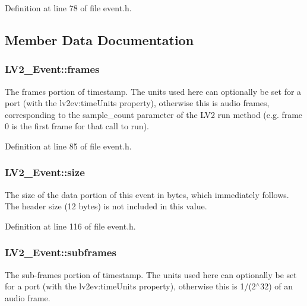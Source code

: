 Definition at line 78 of file event.\+h.



\subsection{Member Data Documentation}
\subsubsection[{\texorpdfstring{frames}{frames}}]{ L\+V2\+\_\+\+Event\+::frames}\hypertarget{struct_l_v2___event_ab7de52fc53223b6fe231f4bde89c563d}{}\label{struct_l_v2___event_ab7de52fc53223b6fe231f4bde89c563d}
The frames portion of timestamp. The units used here can optionally be set for a port (with the lv2ev\+:time\+Units property), otherwise this is audio frames, corresponding to the sample\+\_\+count parameter of the L\+V2 run method (e.\+g. frame 0 is the first frame for that call to run). 

Definition at line 85 of file event.\+h.

\subsubsection[{\texorpdfstring{size}{size}}]{ L\+V2\+\_\+\+Event\+::size}\hypertarget{struct_l_v2___event_a2036cca2f4ebb4f4010f187a78af3f57}{}\label{struct_l_v2___event_a2036cca2f4ebb4f4010f187a78af3f57}
The size of the data portion of this event in bytes, which immediately follows. The header size (12 bytes) is not included in this value. 

Definition at line 116 of file event.\+h.

\subsubsection[{\texorpdfstring{subframes}{subframes}}]{ L\+V2\+\_\+\+Event\+::subframes}\hypertarget{struct_l_v2___event_ab6083a09d5433f704de0c94ca4332581}{}\label{struct_l_v2___event_ab6083a09d5433f704de0c94ca4332581}
The sub-\/frames portion of timestamp. The units used here can optionally be set for a port (with the lv2ev\+:time\+Units property), otherwise this is 1/(2$^\wedge$32) of an audio frame. 

